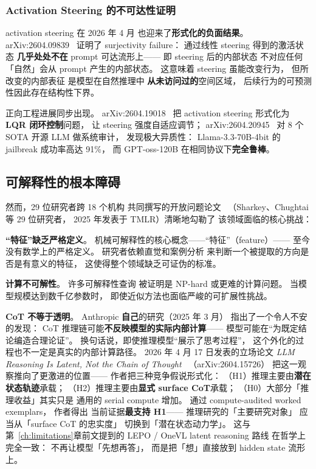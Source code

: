 \subsubsection{Activation Steering 的不可达性证明}

activation steering 在 2026 年 4 月
也迎来了\textbf{形式化的负面结果}。
arXiv:2604.09839~\cite{steerunreach2604}
证明了 surjectivity failure：
通过线性 steering 得到的激活状态
\textbf{几乎处处不在} prompt 可达流形上——
即 steering 后的内部状态
不对应任何「自然」会从 prompt 产生的内部状态。
这意味着 steering 虽能改变行为，
但所改变的内部表征
是模型在自然推理中
\textbf{从未访问过的}空间区域，
后续行为的可预测性因此存在结构性下界。

正向工程进展同步出现。
arXiv:2604.19018~\cite{lqrsteering2604}
把 activation steering 形式化为
\textbf{LQR 闭环控制}问题，
让 steering 强度自适应调节；
arXiv:2604.20945~\cite{auditjailbreak2604}
对 8 个 SOTA 开源 LLM 做系统审计，
发现极大异质性：
Llama-3.3-70B-4bit 的 jailbreak 成功率高达 91\%，
而 GPT-oss-120B 在相同协议下\textbf{完全鲁棒}。

\subsection{可解释性的根本障碍}

然而，29 位研究者跨 18 个机构
共同撰写的开放问题论文~\cite{nanda2025openproblems}
（Sharkey、Chughtai 等 29 位研究者，
2025 年发表于 TMLR）清晰地勾勒了
该领域面临的核心挑战：

\textbf{``特征''缺乏严格定义}。
机械可解释性的核心概念——``特征''（feature）——
至今没有数学上的严格定义。
研究者依赖直觉和案例分析
来判断一个被提取的方向是否是有意义的特征，
这使得整个领域缺乏可证伪的标准。

\textbf{计算不可解性}。
许多可解释性查询
被证明是 NP-hard 或更难的计算问题。
当模型规模达到数千亿参数时，
即使近似方法也面临严峻的可扩展性挑战。

\textbf{CoT 不等于透明}。
Anthropic \textbf{自己}的研究（2025 年 3 月）
指出了一个令人不安的发现：
CoT 推理链可能\textbf{不反映模型的实际内部计算}——
模型可能在``为既定结论编造合理论证''。
换句话说，即使推理模型``展示了思考过程''，
这个外化的过程也不一定是真实的内部计算路径。
2026 年 4 月 17 日发表的立场论文
\emph{LLM Reasoning Is Latent, Not the Chain of Thought}~\cite{latentreasoning2604}
（arXiv:2604.15726）
把这一观察推向了更激进的位置——
作者把三种竞争假说形式化：
（H1）推理主要由\textbf{潜在状态轨迹}承载；
（H2）推理主要由\textbf{显式 surface CoT}承载；
（H0）大部分「推理收益」其实只是
通用的 serial compute 增加。
通过 compute-audited worked exemplars，
作者得出
当前证据\textbf{最支持 H1}——
推理研究的「主要研究对象」
应当从「surface CoT 的忠实度」
切换到「潜在状态动力学」。
这与第~\ref{ch:limitations}章前文提到的
LEPO / OneVL latent reasoning 路线
在哲学上完全一致：
不再让模型「先想再答」，
而是把「想」直接放到 hidden state 流形上。

